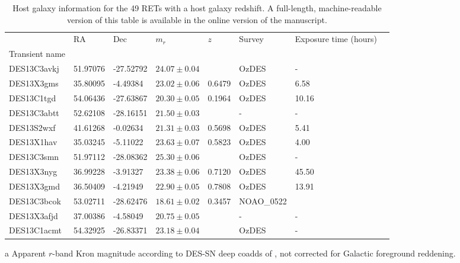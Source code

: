 \documentclass[fleqn,usenatbib,]{mnras}
\begin{document}
\begin{table}
\caption{Host galaxy information for the 49 RETs with a host galaxy redshift. A full-length, machine-readable version of this table is available in the online version of the manuscript.}

\begin{threeparttable}
\begin{tabular}{llllllll}

\toprule
{} &       RA &       Dec &    $m_r$\tnote{a}  &     $z$ &     Survey & Exposure time (hours) \tnote{b} \\
Transient name &          &           &          &         &         &            &               \\
\midrule
DES13C3avkj    & 51.97076 & -27.52792 & $24.07 \pm 0.04$ &    \tnote{c} &      OzDES &             - \\
DES13X3gms     & 35.80095 &  -4.49384 & $23.02 \pm 0.06$ & 0.6479 &      OzDES &       6.58 \\
DES13C1tgd     & 54.06436 & -27.63867 & $20.30 \pm 0.05$ & 0.1964 &      OzDES &      10.16 \\
DES13C3abtt    & 52.62108 & -28.16151 & $21.50 \pm 0.03$ &    \tnote{d} &          - &             - \\
DES13S2wxf\tnote{e}     & 41.61268 &  -0.02634 & $21.31 \pm 0.03$ & 0.5698 &      OzDES &       5.41 \\
DES13X1hav     & 35.03245 &  -5.11022 & $23.63 \pm 0.07$ & 0.5823 &      OzDES &       4.00 \\
DES13C3smn     & 51.97112 & -28.08362 & $25.30 \pm 0.06$ &    \tnote{c} &      OzDES &             - \\
DES13X3nyg     & 36.99228 &  -3.91327 & $23.38 \pm 0.06$ & 0.7120 &      OzDES &      45.50 \\
DES13X3gmd\tnote{e}     & 36.50409 &  -4.21949 & $22.90 \pm 0.05$ & 0.7808 &      OzDES &      13.91 \\
DES13C3bcok    & 53.02711 & -28.62476 & $18.61 \pm 0.02$ & 0.3457 &  NOAO\_0522 &               \\
DES13X3afjd    & 37.00386 &  -4.58049 & $20.75 \pm 0.05$ &    \tnote{d} &          - &             - \\
DES13C1acmt    & 54.32925 & -26.83371 & $23.18 \pm 0.04$ &    \tnote{c} &      OzDES &             - \\
\bottomrule
\end{tabular}
\begin{tablenotes}
\item[a] Apparent $r$-band Kron magnitude according to DES-SN deep coadds of \citet{Wiseman2020}, not corrected for Galactic foreground reddening.

\end{tablenotes}
\end{threeparttable}
\end{table}
\end{document}
